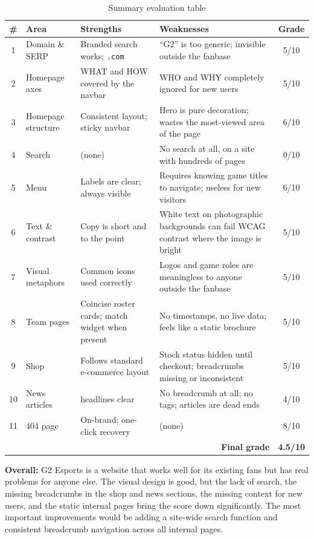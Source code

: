 \documentclass[12pt, a4paper]{article}
\begin{document}
\begin{table}[H]
  \centering
  \begin{tabularx}{\textwidth}{clXXc}
    \toprule
    \textbf{\#} & \textbf{Area} & \textbf{Strengths} & \textbf{Weaknesses} & \textbf{Grade} \\
    \midrule
    1 & Domain \& SERP
      & Branded search works; \texttt{.com}
      & ``G2'' is too generic; invisible outside the fanbase
      & 5/10 \\
    2 & Homepage axes
      & WHAT and HOW covered by the navbar
      & WHO and WHY completely ignored for new users
      & 5/10 \\
    3 & Homepage structure
      & Consistent layout; sticky navbar
      & Hero is pure decoration; wastes the most-viewed area of the page
      & 6/10 \\
    4 & Search
      & (none)
      & No search at all, on a site with hundreds of pages
      & 0/10 \\
    5 & Menu
      & Labels are clear; always visible
      & Requires knowing game titles to navigate; useless for new visitors
      & 6/10 \\
    6 & Text \& contrast
      & Copy is short and to the point
      & White text on photographic backgrounds can fail WCAG contrast where the image is bright
      & 5/10 \\
    7 & Visual metaphors
      & Common icons used correctly
      & Logos and game roles are meaningless to anyone outside the fanbase
      & 5/10 \\
    8 & Team pages
      & Coincise roster cards; match widget when present
      & No timestamps, no live data; feels like a static brochure
      & 5/10 \\
    9 & Shop
      & Follows standard e-commerce layout
      & Stock status hidden until checkout; breadcrumbs missing or inconsistent
      & 5/10 \\
    10 & News articles
      & headlines clear
      & No breadcrumb at all; no tags; articles are dead ends
      & 4/10 \\
    11 & 404 page
      & On-brand; one-click recovery
      & (none)
      & 8/10 \\
    \midrule
    \multicolumn{4}{r}{\textbf{Final grade}} & \textbf{4.5/10} \\
    \bottomrule
  \end{tabularx}
  \caption{Summary evaluation table}
  \label{tab:final}
\end{table}

\textbf{Overall:} G2 Esports is a website that works well for its existing fans but has real problems for anyone else. The visual design is good, but the lack of search, the missing breadcrumbs in the shop and news sections, the missing context for new users, and the static internal pages bring the score down significantly. The most important improvements would be adding a site-wide search function and consistent breadcrumb navigation across all internal pages.

\end{document}
